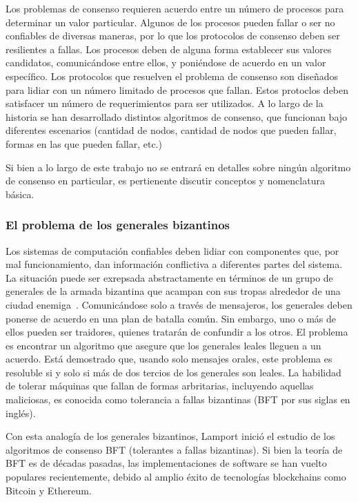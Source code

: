 Los problemas de consenso requieren acuerdo entre un número de procesos para determinar un valor particular.
%
Algunos de los procesos pueden fallar o ser no confiables de diversas maneras, por lo que los protocolos de
consenso deben ser resilientes a fallas.
%
Los procesos deben de alguna forma establecer sus valores candidatos, comunicándose entre ellos, y
poniéndose de acuerdo en un valor específico.
%
Los protocolos que resuelven el problema de consenso son diseñados para lidiar con un número limitado de procesos
que fallan.
%
Estos protoclos deben satisfacer un número de requerimientos para ser utilizados.
%
A lo largo de la historia se han desarrollado distintos algoritmos de consenso, que funcionan bajo diferentes
escenarios (cantidad de nodos, cantidad de nodos que pueden fallar, formas en las que pueden fallar, etc.)

%

Si bien a lo largo de este trabajo no se entrará en detalles sobre ningún algoritmo de consenso en particular,
es pertienente discutir conceptos y nomenclatura básica.

\subsubsection{El problema de los generales bizantinos}

Los sistemas de computación confiables deben lidiar con componentes que, por mal funcionamiento,
dan información conflictiva a diferentes partes del sistema.
La situación puede ser exrepsada abstractamente
en términos de un grupo de generales de la armada bizantina que acampan con sus tropas alrededor de una
ciudad enemiga~\cite{byzantineproblem}.
Comunicándose solo a través de mensajeros, los generales deben ponerse de acuerdo en una plan
de batalla común.
Sin embargo, uno o más de ellos pueden ser traidores, quienes tratarán de confundir a los
otros.
El problema es encontrar un algoritmo que asegure que los generales leales lleguen a un acuerdo.
Está demostrado que, usando solo mensajes orales, este problema es resoluble si y solo si más de dos tercios
de los generales son leales.
La habilidad de tolerar máquinas que fallan de formas arbritarias, incluyendo aquellas maliciosas,
es conocida como tolerancia a fallas bizantinas (BFT por sus siglas en inglés).

%

Con esta analogía de los generales bizantinos, Lamport inició el estudio de los algoritmos de consenso BFT
(tolerantes a fallas bizantinas).
Si bien la teoría de
BFT es de décadas pasadas, las implementaciones de software se han vuelto populares recientemente,
debido al amplio éxito de tecnologías blockchains como Bitcoin y Ethereum.

